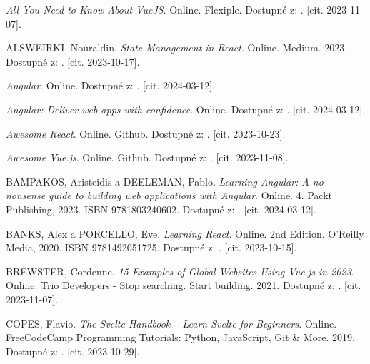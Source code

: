 

\begin{thebibliography}{99}\radkovani[1.2]\raggedright
\label{chap:literatura}

\emph{All You Need to Know About VueJS}. Online. Flexiple. Dostupné z: . [cit. 2023-11-07].

\textsc{ALSWEIRKI}, Nouraldin. \emph{State Management in React}. Online. Medium. 2023. Dostupné z: . [cit. 2023-10-17].

\emph{Angular}. Online. Dostupné z: . [cit. 2024-03-12].

\emph{Angular: Deliver web apps with confidence}. Online. Dostupné z: . [cit. 2024-03-12].

\emph{Awesome React}. Online. Github. Dostupné z: . [cit. 2023-10-23].

\emph{Awesome Vue.js}. Online. Github. Dostupné z: . [cit. 2023-11-08].

\textsc{BAMPAKOS}, Aristeidis a \textsc{DEELEMAN}, Pablo. \emph{Learning Angular: A no-nonsense guide to building web applications with Angular}. Online. 4. Packt Publishing, 2023. ISBN 9781803240602. Dostupné z: . [cit. 2024-03-12].

\textsc{BANKS}, Alex a \textsc{PORCELLO}, Eve. \emph{Learning React}. Online. 2nd Edition. O'Reilly Media, 2020. ISBN 9781492051725. Dostupné z: . [cit. 2023-10-15].

\textsc{BREWSTER}, Cordenne. \emph{15 Examples of Global Websites Using Vue.js in 2023}. Online. Trio Developers - Stop searching. Start building. 2021. Dostupné z: . [cit. 2023-11-07].

\textsc{COPES}, Flavio. \emph{The Svelte Handbook -- Learn Svelte for Beginners}. Online. FreeCodeCamp Programming Tutorials: Python, JavaScript, Git \& More. 2019. Dostupné z: . [cit. 2023-10-29].


\end{thebibliography}
